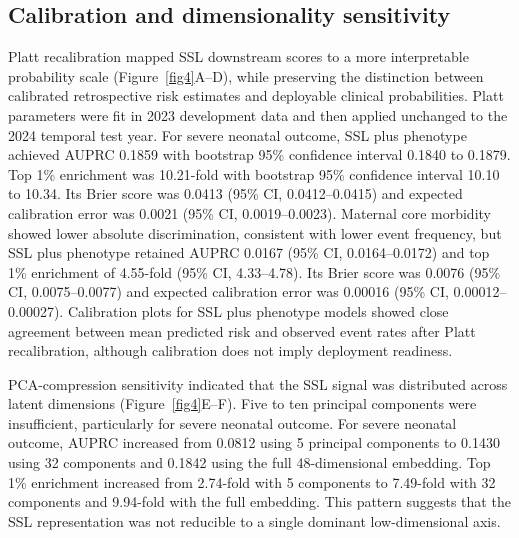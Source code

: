\documentclass[pdflatex,sn-vancouver-num]{sn-jnl}
\begin{document}
\subsection{Calibration and dimensionality sensitivity}\label{subsec:calibration-results}

Platt recalibration mapped SSL downstream scores to a more interpretable probability scale (Figure~\ref{fig4}A--D), while preserving the distinction between calibrated retrospective risk estimates and deployable clinical probabilities. Platt parameters were fit in 2023 development data and then applied unchanged to the 2024 temporal test year. For severe neonatal outcome, SSL plus phenotype achieved AUPRC 0.1859 with bootstrap 95\% confidence interval 0.1840 to 0.1879. Top 1\% enrichment was 10.21-fold with bootstrap 95\% confidence interval 10.10 to 10.34. Its Brier score was 0.0413 (95\% CI, 0.0412--0.0415) and expected calibration error was 0.0021 (95\% CI, 0.0019--0.0023). Maternal core morbidity showed lower absolute discrimination, consistent with lower event frequency, but SSL plus phenotype retained AUPRC 0.0167 (95\% CI, 0.0164--0.0172) and top 1\% enrichment of 4.55-fold (95\% CI, 4.33--4.78). Its Brier score was 0.0076 (95\% CI, 0.0075--0.0077) and expected calibration error was 0.00016 (95\% CI, 0.00012--0.00027). Calibration plots for SSL plus phenotype models showed close agreement between mean predicted risk and observed event rates after Platt recalibration, although calibration does not imply deployment readiness.

PCA-compression sensitivity indicated that the SSL signal was distributed across latent dimensions (Figure~\ref{fig4}E--F). Five to ten principal components were insufficient, particularly for severe neonatal outcome. For severe neonatal outcome, AUPRC increased from 0.0812 using 5 principal components to 0.1430 using 32 components and 0.1842 using the full 48-dimensional embedding. Top 1\% enrichment increased from 2.74-fold with 5 components to 7.49-fold with 32 components and 9.94-fold with the full embedding. This pattern suggests that the SSL representation was not reducible to a single dominant low-dimensional axis.
\end{document}
